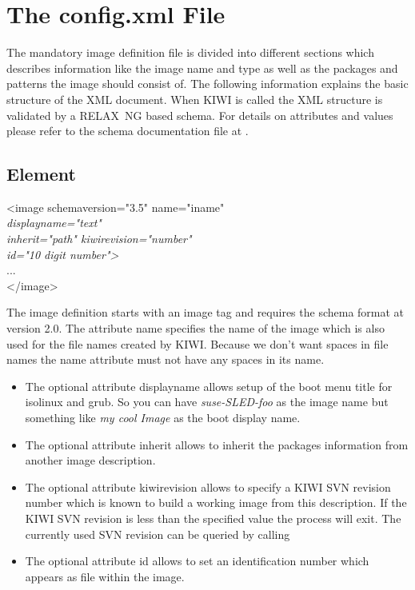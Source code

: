 \section{The config.xml File}
The mandatory image definition file is divided into different sections
which describes information like the image name and type as well as
the packages and patterns the image should consist of. The following
information explains the basic structure of the XML document. When KIWI
is called the XML structure is validated by a RELAX~NG based schema.
For details on attributes and values please refer to the schema
documentation file at .

\subsection{ Element}
\begin{Command}{12cm}
<image schemaversion="3.5" name="iname"\\
\hspace*{1.9cm}\textit{displayname="text"}\\
\hspace*{1.9cm}\textit{inherit="path" kiwirevision="number"}\\
\hspace*{1.9cm}\textit{id="10 digit number">}\\
\hspace*{1cm}...\\
</image>
\end{Command}

The image definition starts with an image tag and requires the
schema format at version 2.0. The attribute name specifies the
name of the image which is also used for the file names created
by KIWI. Because we don't want spaces in file names the name
attribute must not have any spaces in its name.

\begin{itemize}
\item The optional attribute displayname allows setup of the boot
      menu title for isolinux and grub. So you can have
      \textit{suse-SLED-foo} as the image name but something like
      \textit{my cool Image} as the boot display name.
\item The optional attribute inherit allows to inherit the
      packages information from another image description.
\item The optional attribute kiwirevision allows to specify
      a KIWI SVN revision number which is known to build
      a working image from this description. If the KIWI SVN
      revision is less than the specified value the
      process will exit. The currently used SVN revision can
      be queried by calling 
\item The optional attribute id allows to set an identification
      number which appears as file  within the
      image.
\end{itemize}


